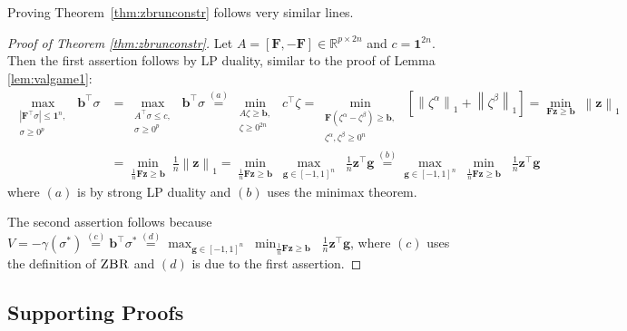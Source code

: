 \documentclass{colt2015} %
\newcommand{\vF}{\mathbf{F}}
\newcommand{\vb}{\mathbf{b}}
\newcommand{\vg}{\mathbf{g}}
\newcommand{\vz}{\mathbf{z}}
\newcommand{\RR}{\mathbb{R}}      %
\newcommand{\vnorm}[1]{\left\lVert#1\right\rVert} %
\newcommand{\abs}[1]{\left| #1 \right|}
\newcommand{\zbr}{\textsc{ZBR}}
\begin{document}
Proving Theorem~\ref{thm:zbrunconstr} follows very similar lines.
\begin{proof}[Proof of Theorem \ref{thm:zbrunconstr}]
Let $A = [\vF, -\vF] \in \RR^{p \times 2n}$ and $c = \mathbf{1}^{2n}$. 
Then the first assertion follows by LP duality, similar to the proof of Lemma \ref{lem:valgame1}: 
\begin{align*}
\max_{\substack{ \abs{\vF^\top \sigma} \leq \mathbf{1}^n , \\ \sigma \geq 0^p }} \; \vb^\top \sigma 
&= \max_{\substack{ A^\top \sigma \leq c , \\ \sigma \geq 0^p }} \; \vb^\top \sigma 
\stackrel{(a)}{=} \min_{\substack{ A \zeta \geq \vb , \\ \zeta \geq 0^{2n} }} \; c^\top \zeta 
= \min_{\substack{ \vF (\zeta^{\alpha} - \zeta^{\beta}) \geq \vb , \\ \zeta^{\alpha} , \zeta^{\beta} \geq 0^{n} }} \; 
\left[ \vnorm{\zeta^{\alpha}}_1 + \vnorm{\zeta^{\beta}}_1 \right] 
= \min_{ \vF \vz \geq \vb } \; \vnorm{\vz}_1 \\
&= \min_{ \frac{1}{n} \vF \vz \geq \vb } \; \frac{1}{n} \vnorm{\vz}_1 
= \min_{\frac{1}{n} \vF \vz \geq \vb } \;\max_{\vg \in [-1,1]^n} \;\; \frac{1}{n} \vz^\top \vg
\stackrel{(b)}{=} \max_{\vg \in [-1,1]^n} \;\min_{\frac{1}{n} \vF \vz \geq \vb } \;\; \frac{1}{n} \vz^\top \vg
\end{align*}
where $(a)$ is by strong LP duality and $(b)$ uses the minimax theorem. 

The second assertion follows because 
$\displaystyle V = - \gamma (\sigma^*) \stackrel{(c)}{=} \vb^\top \sigma^* 
\stackrel{(d)}{=} \max_{\vg \in [-1,1]^n} \;\min_{\frac{1}{n} \vF \vz \geq \vb } \;\; \frac{1}{n} \vz^\top \vg$\;, 
where $(c)$ uses the definition of $\zbr$ 
and $(d)$ is due to the first assertion. 
\end{proof}

\subsection{Supporting Proofs}
\label{sec:morepfsgame1}
\end{document}
